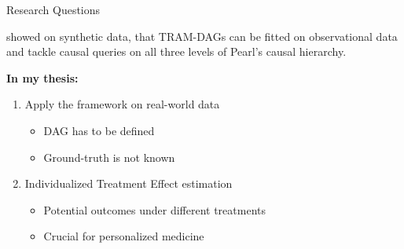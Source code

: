 \documentclass[onlytextwidth,english]{beamer}\usepackage[]{graphicx}\usepackage[]{xcolor}
\begin{document}
\begin{frame}{Research Questions}

\citet{sick2025} showed on synthetic data, that TRAM-DAGs can be fitted on observational data and tackle causal queries on all three levels of Pearl's causal hierarchy.

\textbf{In my thesis:}


\begin{enumerate}
    \item Apply the framework on real-world data
    
    \begin{itemize}
        \item DAG has to be defined
        \item Ground-truth is not known
    \end{itemize}
    
    \item Individualized Treatment Effect estimation
    \begin{itemize}
        \item Potential outcomes under different treatments
        \item Crucial for personalized medicine
    \end{itemize}
\end{enumerate}
\end{frame}



% 
% 
\end{document}
